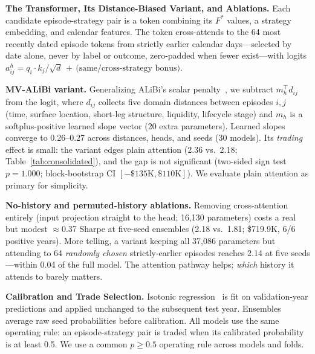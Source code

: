 \documentclass[sigconf,review,anonymous]{acmart}
\begin{document}
\medskip\noindent\textbf{The Transformer, Its Distance-Biased Variant, and Ablations.}
\label{sec:transformer}
Each candidate episode-strategy pair is a token combining its $F^{\ast}$ values, a strategy embedding, and calendar features. The token cross-attends to the 64 most recently dated episode tokens from strictly earlier calendar days---selected by date alone, never by label or outcome, zero-padded when fewer exist---with logits
$a^{h}_{ij}=q_i\!\cdot\!k_j/\sqrt{d}\,+\,\text{(same/cross-strategy bonus)}$.

\noindent\textbf{MV-ALiBi variant.} Generalizing ALiBi's scalar penalty~\cite{press2022alibi}, we subtract $m_h^{\top}d_{ij}$ from the logit, where $d_{ij}$ collects five domain distances between episodes $i,j$ (time, surface location, short-leg structure, liquidity, lifecycle stage) and $m_h$ is a softplus-positive learned slope vector (20 extra parameters). Learned slopes converge to 0.26--0.27 across distances, heads, and seeds (30 models). Its \emph{trading} effect is small: the variant edges plain attention (2.36 vs.\ 2.18; Table~\ref{tab:consolidated}), and the gap is not significant (two-sided sign test $p=1.000$; block-bootstrap CI $[-\$135\text{K},\$110\text{K}]$). We evaluate plain attention as primary for simplicity.

\noindent\textbf{No-history and permuted-history ablations.}
\label{sec:ablations}
Removing cross-attention entirely (input projection straight to the head; 16{,}130 parameters) costs a real but modest $\approx$0.37 Sharpe at five-seed ensembles (2.18 vs.\ 1.81; \$719.9K, 6/6 positive years). More telling, a variant keeping all 37{,}086 parameters but attending to 64 \emph{randomly chosen} strictly-earlier episodes reaches 2.14 at five seeds---within 0.04 of the full model. The attention pathway helps; \emph{which} history it attends to barely matters.

\medskip\noindent\textbf{Calibration and Trade Selection.}
\label{sec:calibration}
Isotonic regression~\cite{zadrozny2002transforming} is fit on validation-year predictions and applied unchanged to the subsequent test year. Ensembles average raw seed probabilities before calibration. All models use the same operating rule: an episode-strategy pair is traded when its calibrated probability is at least 0.5. We use a common $p\ge0.5$ operating rule across models and folds.
\end{document}
